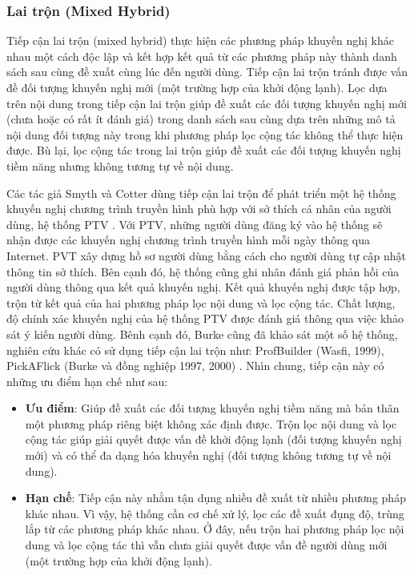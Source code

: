 \subsubsection{Lai trộn (Mixed Hybrid)}
Tiếp cận lai trộn (mixed hybrid) thực hiện các phương pháp khuyến nghị khác nhau một cách độc lập và kết hợp kết quả từ các phương pháp này thành danh sách sau cùng đề xuất cùng lúc đến người dùng. Tiếp cận lai trộn tránh được vấn đề đối tượng khuyến nghị mới (một trường hợp của khởi động lạnh). Lọc dựa trên nội dung trong tiếp cận lai trộn giúp đề xuất các đối tượng khuyến nghị mới (chưa hoặc có rất ít đánh giá) trong danh sách sau cùng dựa trên những mô tả nội dung đối tượng này trong khi phương pháp lọc cộng tác không thể thực hiện được. Bù lại, lọc cộng tác trong lai trộn giúp đề xuất các đối tượng khuyến nghị tiềm năng nhưng không tương tự về nội dung.

Các tác giả Smyth và Cotter dùng tiếp cận lai trộn để phát triển một hệ thống khuyến nghị chương trình truyền hình phù hợp với sở thích cá nhân của người dùng, hệ thống PTV \cite{Smyth:2000:PTL}. Với PTV, những người dùng đăng ký vào hệ thống sẽ nhận được các khuyến nghị chương trình truyền hình mỗi ngày thông qua Internet. PVT xây dựng hồ sơ người dùng bằng cách cho người dùng tự cập nhật thông tin sở thích. Bên cạnh đó, hệ thống cũng ghi nhân đánh giá phản hồi của người dùng thông qua kết quả khuyến nghị. Kết quả khuyến nghị được tập hợp, trộn từ kết quả của hai phương pháp lọc nội dung và lọc cộng tác. Chất lượng, độ chính xác khuyến nghị của hệ thống PTV được đánh giá thông qua việc khảo sát ý kiến người dùng. Bênh cạnh đó, Burke cũng đã khảo sát một số hệ thống, nghiên cứu khác có sử dụng tiếp cận lai trộn như: ProfBuilder (Wasfi, 1999), PickAFlick (Burke và đồng nghiệp 1997, 2000) \cite{Robin:2002:HybridRS_Survey}. Nhìn chung, tiếp cận này có những ưu điểm hạn chế như sau:
\begin{itemize}
	\item \textbf{Ưu điểm}: Giúp đề xuất các đối tượng khuyến nghị tiềm năng mà bản thân một phương pháp riêng biệt không xác định được. Trộn lọc nội dung và lọc cộng tác giúp giải quyết được vấn đề khởi động lạnh (đối tượng khuyến nghị mới) và có thể đa dạng hóa khuyến nghị (đối tượng không tương tự về nội dung).
\end{itemize}
\begin{itemize}
	\item \textbf{Hạn chế}: Tiếp cận này nhằm tận dụng nhiều đề xuất từ nhiều phương pháp khác nhau. Vì vậy, hệ thống cần cơ chế xử lý, lọc các đề xuất đụng độ, trùng lắp từ các phương pháp khác nhau. Ở đây, nếu trộn hai phương pháp lọc nội dung và lọc cộng tác thì vẫn chưa giải quyết được vấn đề người dùng mới (một trường hợp của khởi động lạnh).
\end{itemize}

